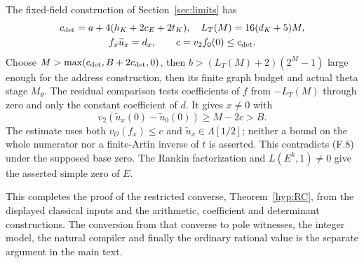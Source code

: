 The fixed-field construction of Section~\ref{sec:limits} has
\[
 \begin{gathered}
 c_{\rm det}=a+4(h_K+2c_E+2t_K),\quad
 L_T(M)=16(d_K+5)M,\\
 f_x\widetilde u_x=d_x,\qquad
 c=v_2f_0(0)\le c_{\rm det}.
 \end{gathered}
\]
Choose $M>\max(c_{\rm det},B+2c_{\rm det},0)$, then
$b>(L_T(M)+2)(2^M-1)$ large enough for the address construction,
then its finite graph budget and actual theta stage $M_\theta$.
The residual comparison tests coefficients of $f$ from
$-L_T(M)$ through zero and only the constant coefficient of $d$.
It gives $x\ne0$ with
\[
       v_2(\widetilde u_x(0)-\widetilde u_0(0))\ge M-2c>B.
\]
The estimate uses both $v_{\mathscr O}(f_x)\le c$ and
$\widetilde u_x\in\Lambda[1/2]$; neither a bound on the whole
numerator nor a finite-Artin inverse of $t$ is asserted.
This contradicts (F.8) under the supposed base zero.
The Rankin factorization and $L(E^k,1)\ne0$ give the asserted
simple zero of $E$.

This completes the proof of the restricted converse,
Theorem~\ref{hyp:RC}, from the displayed classical inputs and
the arithmetic, coefficient and determinant constructions.
The conversion from that converse to pole witnesses, the integer
model, the natural compiler and finally the ordinary rational value
is the separate argument in the main text.



